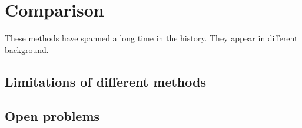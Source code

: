 \section{Comparison}
These methods have spanned a long time in the history. They appear in different background. 
\subsection{Limitations of different methods}
\subsection{Open problems}
